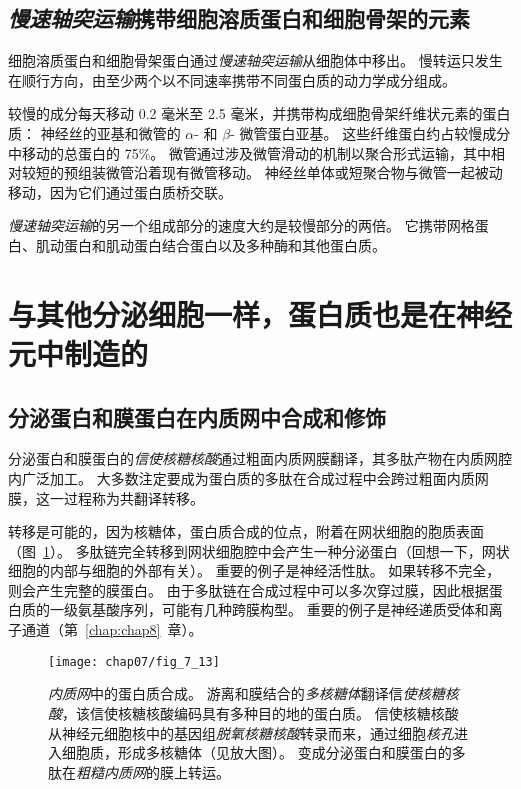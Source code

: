 \subsection{\textit{慢速轴突运输}携带细胞溶质蛋白和细胞骨架的元素}

细胞溶质蛋白和细胞骨架蛋白通过\textit{慢速轴突运输}从细胞体中移出。
慢转运只发生在顺行方向，由至少两个以不同速率携带不同蛋白质的动力学成分组成。


较慢的成分每天移动 0.2 毫米至 2.5 毫米，并携带构成细胞骨架纤维状元素的蛋白质：
神经丝的亚基和微管的 $\alpha$- 和 $\beta$- 微管蛋白亚基。
这些纤维蛋白约占较慢成分中移动的总蛋白的 75\%。 
微管通过涉及微管滑动的机制以聚合形式运输，其中相对较短的预组装微管沿着现有微管移动。
神经丝单体或短聚合物与微管一起被动移动，因为它们通过蛋白质桥交联。


\textit{慢速轴突运输}的另一个组成部分的速度大约是较慢部分的两倍。
它携带网格蛋白、肌动蛋白和肌动蛋白结合蛋白以及多种酶和其他蛋白质。



\section{与其他分泌细胞一样，蛋白质也是在神经元中制造的}

\subsection{分泌蛋白和膜蛋白在内质网中合成和修饰}

分泌蛋白和膜蛋白的\textit{信使核糖核酸}通过粗面内质网膜翻译，其多肽产物在内质网腔内广泛加工。
大多数注定要成为蛋白质的多肽在合成过程中会跨过粗面内质网膜，这一过程称为共翻译转移。


转移是可能的，因为核糖体，蛋白质合成的位点，附着在网状细胞的胞质表面（图~\ref{fig:7_13}）。
多肽链完全转移到网状细胞腔中会产生一种分泌蛋白（回想一下，网状细胞的内部与细胞的外部有关）。
重要的例子是神经活性肽。
如果转移不完全，则会产生完整的膜蛋白。
由于多肽链在合成过程中可以多次穿过膜，因此根据蛋白质的一级氨基酸序列，可能有几种跨膜构型。
重要的例子是神经递质受体和离子通道（第~\ref{chap:chap8}~章）。


\begin{figure}[htbp]
	\centering
	\texttt{[image: chap07/fig\_7\_13]}
	\caption{\textit{内质网}中的蛋白质合成。
		游离和膜结合的\textit{多核糖体}翻译信\textit{使核糖核酸}，该信使核糖核酸编码具有多种目的地的蛋白质。
		信使核糖核酸从神经元细胞核中的基因组\textit{脱氧核糖核酸}转录而来，通过细胞\textit{核孔}进入细胞质，形成多核糖体（见放大图）。
		变成分泌蛋白和膜蛋白的多肽在\textit{粗糙内质网}的膜上转运。}
	\label{fig:7_13}
\end{figure}


